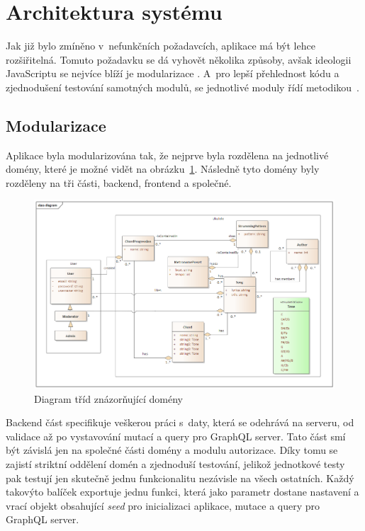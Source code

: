 \section{Architektura systému}
\label{sc:system_architecture}
Jak již bylo zmíněno v~nefunkčních požadavcích, aplikace má být lehce rozšiřitelná. Tomuto požadavku se dá vyhovět několika způsoby, avšak ideologii JavaScriptu se nejvíce blíží je modularizace \cite{bevacqua_2018_mastering}. A~pro lepší přehlednost kódu a zjednodušení testování samotných modulů, se jednotlivé moduly řídí metodikou~.

\subsection{Modularizace}
Aplikace byla modularizována tak, že nejprve byla rozdělena na jednotlivé domény, které je možné vidět na obrázku~\ref{fig:class_diagram}. Následně tyto domény byly rozděleny na tři části, backend, frontend a společné.

\begin{figure}
    \centering
    \includegraphics[width=\textwidth]{assets/class_diagram.png}
    \caption{Diagram tříd znázorňující domény}
    \label{fig:class_diagram}
\end{figure}

Backend část specifikuje veškerou práci s~daty, která se odehrává na serveru, od validace až po vystavování mutací a query pro GraphQL server. Tato část smí být závislá jen na společné části domény a modulu autorizace. Díky tomu se zajistí striktní oddělení domén a zjednoduší testování, jelikož jednotkové testy pak testují jen skutečně jednu funkcionalitu nezávisle na všech ostatních. Každý takovýto balíček exportuje jednu funkci, která jako parametr dostane nastavení a vrací objekt obsahující \emph{seed} pro inicializaci aplikace, mutace a query pro GraphQL server.

